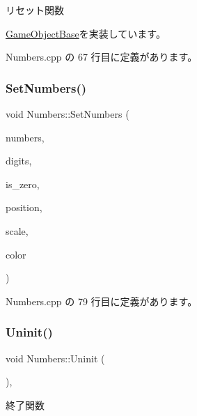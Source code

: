 リセット関数 



\mbox{\hyperlink{class_game_object_base_a85c59554f734bcb09f1a1e18d9517dce}{Game\+Object\+Base}}を実装しています。



 Numbers.\+cpp の 67 行目に定義があります。

\mbox{\label{class_numbers_aeb51ecf4e148f4ca67ac7788e061f94d}} 
\subsubsection{\texorpdfstring{Set\+Numbers()}{SetNumbers()}}
{\footnotesize\ttfamily void Numbers\+::\+Set\+Numbers (\begin{DoxyParamCaption}\item[{int}]{numbers,  }\item[{int}]{digits,  }\item[{bool}]{is\+\_\+zero,  }\item[{\mbox{\hyperlink{_vector3_d_8h_a5ef6e95dfc5f9d3820b71772d99bbc25}{Vec2}}}]{position,  }\item[{\mbox{\hyperlink{_vector3_d_8h_a5ef6e95dfc5f9d3820b71772d99bbc25}{Vec2}}}]{scale,  }\item[{\mbox{\hyperlink{_vector3_d_8h_a680c30c4a07d86fe763c7e01169cd6cc}{X\+Color4}}}]{color }\end{DoxyParamCaption})}



 Numbers.\+cpp の 79 行目に定義があります。

\mbox{\label{class_numbers_aeaad3cc1b8ae7defe79813b983b04101}} 
\subsubsection{\texorpdfstring{Uninit()}{Uninit()}}
{\footnotesize\ttfamily void Numbers\+::\+Uninit (\begin{DoxyParamCaption}{ }\end{DoxyParamCaption})\hspace{0.3cm}{\ttfamily [override]}, {\ttfamily [virtual]}}



終了関数 



